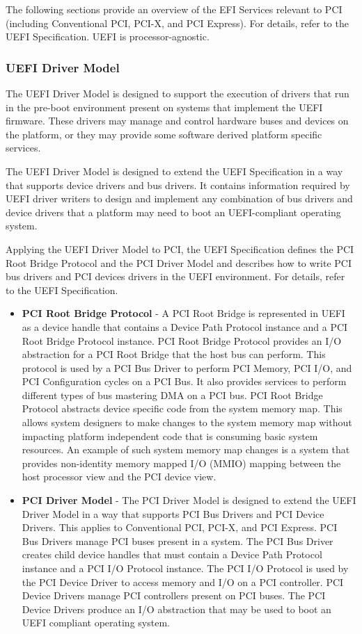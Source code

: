 The following sections provide an overview of the EFI Services relevant to PCI (including Conventional PCI, PCI-X, and PCI Express). For details, refer to the UEFI Specification. UEFI is processor-agnostic.


\subsubsection{UEFI Driver Model}
The UEFI Driver Model is designed to support the execution of drivers that run in the pre-boot environment present on systems that implement the UEFI firmware. These drivers may manage and control hardware buses and devices on the platform, or they may provide some software derived platform specific services.

The UEFI Driver Model is designed to extend the UEFI Specification in a way that supports device drivers and bus drivers. It contains information required by UEFI driver writers to design and implement any combination of bus drivers and device drivers that a platform may need to boot an UEFI-compliant operating system.

Applying the UEFI Driver Model to PCI, the UEFI Specification defines the PCI Root Bridge Protocol and the PCI Driver Model and describes how to write PCI bus drivers and PCI devices drivers in the UEFI environment. For details, refer to the UEFI Specification.

\begin{itemize}
	\item \textbf{PCI Root Bridge Protocol} - A PCI Root Bridge is represented in UEFI as a device handle that contains a Device Path Protocol instance and a PCI Root Bridge Protocol instance. PCI Root Bridge Protocol provides an I/O abstraction for a PCI Root Bridge that the host bus can perform. This protocol is used by a PCI Bus Driver to perform PCI Memory, PCI I/O, and PCI Configuration cycles on a PCI Bus. It also provides services to perform different types of bus mastering DMA on a PCI bus. PCI Root Bridge Protocol abstracts device specific code from the system memory map. This allows system designers to make changes to the system memory map without impacting platform independent code that is consuming basic system resources. An example of such system memory map changes is a system that provides non-identity memory mapped I/O (MMIO) mapping between the host processor view and the PCI device view.
	\item \textbf{PCI Driver Model} - The PCI Driver Model is designed to extend the UEFI Driver Model in a way that supports PCI Bus Drivers and PCI Device Drivers. This applies to Conventional PCI, PCI-X, and PCI Express. PCI Bus Drivers manage PCI buses present in a system. The PCI Bus Driver creates child device handles that must contain a Device Path Protocol instance and a PCI I/O Protocol instance. The PCI I/O Protocol is used by the PCI Device Driver to access memory and I/O on a PCI controller. PCI Device Drivers manage PCI controllers present on PCI buses. The PCI Device Drivers produce an I/O abstraction that may be used to boot an UEFI compliant operating system.
\end{itemize}

